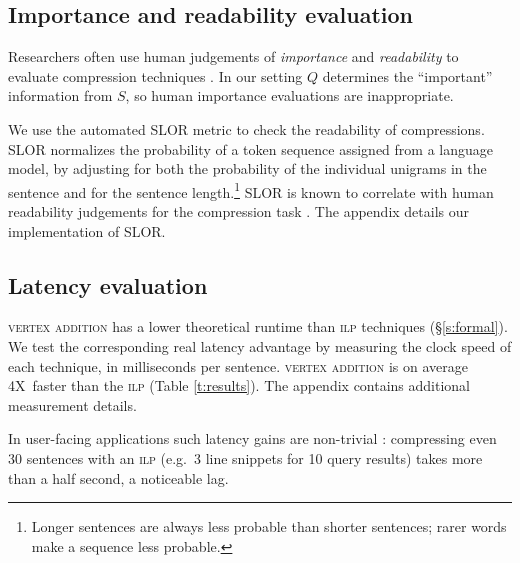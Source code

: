\documentclass[11pt,a4paper]{article}
\newcommand{\speedup}[0]{4X~}
\begin{document}
\subsection{Importance and readability evaluation}\label{s:readabilityinformativeness}

Researchers often use human judgements of \textit{importance} and \textit{readability} to evaluate compression techniques \cite{Knight2000StatisticsBasedS,filippova2015sentence}. In our setting $Q$ determines the ``important'' information from $S$, so human importance evaluations are inappropriate.

We use the automated SLOR metric \cite{lau2015unsupervised} to check the readability of compressions. SLOR normalizes the probability of a token sequence assigned from a language model, by adjusting for both the probability of the individual unigrams in the sentence and for the sentence length.\footnote{Longer sentences are always less probable than shorter sentences; rarer words make a sequence less probable.} SLOR is known to correlate with human readability judgements for the compression task \cite{kannConl}. The appendix details our implementation of SLOR. 

\subsection{Latency evaluation}\label{s:costs}

\textsc{vertex addition} has a lower theoretical runtime than \textsc{ilp} techniques (\S\ref{s:formal}). We test the corresponding real latency advantage by measuring the clock speed of each technique, in milliseconds per sentence. \textsc{vertex addition} is on average \speedup faster than the \textsc{ilp} (Table \ref{t:results}). The appendix contains additional measurement details.

In user-facing applications such latency gains are non-trivial \cite{Nielsen,heerschei,Liu2014TheEO}: compressing even 30 sentences with an \textsc{ilp} (e.g.\ 3 line snippets for 10 query results) takes more than a half second, a noticeable lag. %
\end{document}
